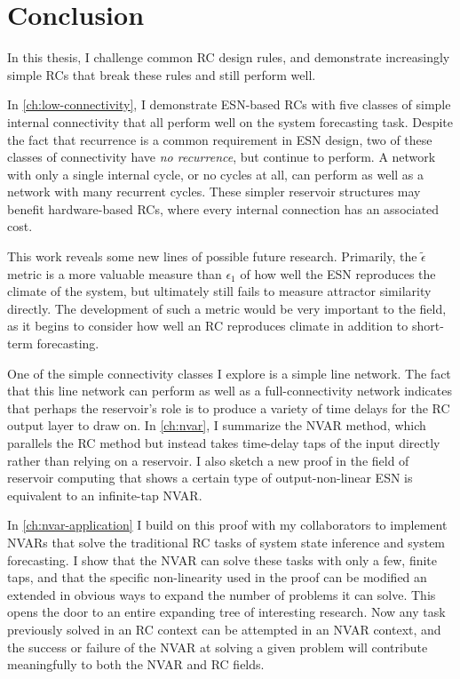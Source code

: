 \chapter{Conclusion}\label{ch:conclusion}

In this thesis, I challenge common RC design rules, and
demonstrate increasingly simple RCs that break these rules and still
perform well.

In \cref{ch:low-connectivity}, I demonstrate ESN-based RCs with five
classes of simple internal connectivity that all perform well on the
system forecasting task. Despite the fact that recurrence is a common
requirement in ESN design, two of these classes of connectivity have
\emph{no recurrence}, but continue to perform. A network with only a
single internal cycle, or no cycles at all, can perform as well as a
network with many recurrent cycles. These simpler reservoir structures
may benefit hardware-based RCs, where every internal connection has an
associated cost.

This work reveals some new lines of possible future
research. Primarily, the $\tilde{\epsilon}$ metric is a more valuable
measure than $\epsilon_1$ of how well the ESN reproduces the climate
of the system, but ultimately still fails to measure attractor
similarity directly. The development of such a metric would be very
important to the field, as it begins to consider how well an RC
reproduces climate in addition to short-term forecasting.

One of the simple connectivity classes I explore is a simple line
network. The fact that this line network can perform as well as a
full-connectivity network indicates that perhaps the reservoir's role
is to produce a variety of time delays for the RC output layer to draw
on. In \cref{ch:nvar}, I summarize the NVAR method, which parallels
the RC method but instead takes time-delay taps of the input directly
rather than relying on a reservoir. I also sketch a new proof in the
field of reservoir computing that shows a certain type of
output-non-linear ESN is equivalent to an infinite-tap NVAR.

In \cref{ch:nvar-application} I build on this proof with my
collaborators to implement NVARs that solve the traditional RC tasks
of system state inference and system forecasting. I show
that the NVAR can solve these tasks with only a few, finite taps, and
that the specific non-linearity used in the proof can be modified an
extended in obvious ways to expand the number of problems it can
solve. This opens the door to an entire expanding tree of interesting
research. Now any task previously solved in an RC context can be
attempted in an NVAR context, and the success or failure of the NVAR
at solving a given problem will contribute meaningfully to both the
NVAR and RC fields.

